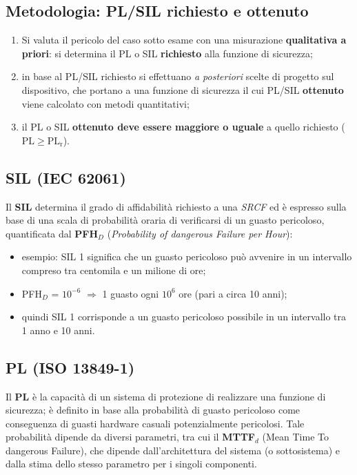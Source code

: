 \subsection{Metodologia: PL/SIL richiesto e ottenuto}
\begin{enumerate}
    \item Si valuta il pericolo del caso sotto esame con una misurazione \textbf{qualitativa a priori}: si determina il PL o SIL \textbf{richiesto} alla funzione di sicurezza;
    \item in base al PL/SIL richiesto si effettuano \emph{a posteriori} scelte di progetto sul dispositivo, che portano a una funzione di sicurezza il cui PL/SIL \textbf{ottenuto} viene calcolato con metodi quantitativi;
    \item il PL o SIL \textbf{ottenuto deve essere maggiore o uguale} a quello richiesto ($\mathrm{PL} \ge \mathrm{PL_r}$).
\end{enumerate}

\subsection{SIL (IEC 62061)}
Il \textbf{SIL} determina il grado di affidabilità richiesto a una \emph{SRCF} ed è espresso sulla base di una scala di probabilità oraria di verificarsi di un guasto pericoloso, quantificata dal \textbf{PFH$_D$} (\emph{Probability of dangerous Failure per Hour}):
\begin{itemize}
    \item esempio: SIL 1 significa che un guasto pericoloso può avvenire in un intervallo compreso tra centomila e un milione di ore;
    \item PFH$_D$ = $10^{-6}$ $\Rightarrow$ 1 guasto ogni $10^6$ ore (pari a circa 10 anni);
    \item quindi SIL 1 corrisponde a un guasto pericoloso possibile in un intervallo tra 1 anno e 10 anni.
\end{itemize}

\subsection{PL (ISO 13849-1)}
Il \textbf{PL} è la capacità di un sistema di protezione di realizzare una funzione di sicurezza; è definito in base alla probabilità di guasto pericoloso come conseguenza di guasti hardware casuali potenzialmente pericolosi. Tale probabilità dipende da diversi parametri, tra cui il \textbf{MTTF$_d$} (Mean Time To dangerous Failure), che dipende dall'architettura del sistema (o sottosistema) e dalla stima dello stesso parametro per i singoli componenti.

